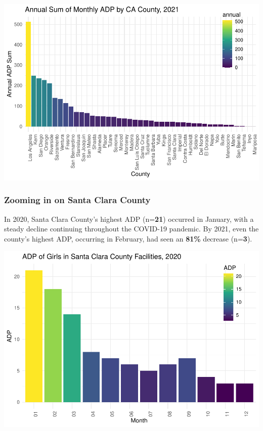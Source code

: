 \documentclass[
]{article}
\begin{document}
\includegraphics{ADP_files/figure-latex/annual_adp-1.pdf}

\hypertarget{zooming-in-on-santa-clara-county}{%
\subsubsection{Zooming in on Santa Clara
County}\label{zooming-in-on-santa-clara-county}}

In 2020, Santa Clara County's highest ADP (n=\textbf{21}) occurred in
January, with a steady decline continuing throughout the COVID-19
pandemic. By 2021, even the county's highest ADP, occurring in February,
had seen an \textbf{81\%} decrease (n=\textbf{3}).

\includegraphics{ADP_files/figure-latex/santa_clara_county-1.pdf}
\end{document}
